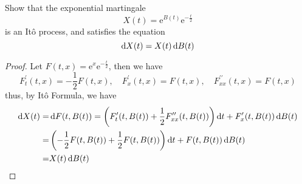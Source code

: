 \begin{example}
	Show that the exponential martingale
	\begin{equation*}
		X(t)=\mathrm{e}^{B(t)}\mathrm{e}^{-\frac{t}{2}}
	\end{equation*}
	is an It\^o process, and satisfies the equation
	\begin{equation*}
		\mathop{}\!\mathrm{d} X(t)=X(t)\mathop{}\!\mathrm{d} B(t)
	\end{equation*}
\end{example}
\begin{proof}
	Let \(F(t,x)=\mathrm{e}^{x}\mathrm{e}^{-\frac{t}{2}}\), then we have
	\begin{equation*}
		F_{t}^{\prime}(t,x)=-\frac{1}{2}F(t,x),\quad F_{x}^{\prime}(t,x)=F(t,x),\quad F_{xx}^{\prime\prime}(t,x)=F(t,x)
	\end{equation*}
	thus, by It\^o Formula, we have
	\begin{equation*}
		\begin{aligned}
			\mathop{}\!\mathrm{d} X(t)= & \mathop{}\!\mathrm{d} F(t,B(t))=\left(F_{t}^{\prime}(t,B(t))+\frac{1}{2}F_{xx}^{\prime\prime}(t,B(t))\right)\mathop{}\!\mathrm{d} t+F_{x}^{\prime}(t,B(t))\mathop{}\!\mathrm{d} B(t) \\
			=          & \left(-\frac{1}{2}F(t,B(t))+\frac{1}{2}F(t,B(t))\right)\mathop{}\!\mathrm{d} t+F(t,B(t))\mathop{}\!\mathrm{d} B(t)                                                  \\
			=          & X(t)\mathop{}\!\mathrm{d} B(t)
		\end{aligned}
	\end{equation*}
\end{proof}

\begin{example}

\end{example}

\begin{example}

\end{example}
